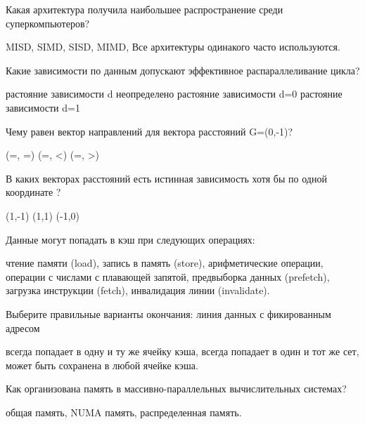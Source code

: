 \documentclass[a4paper, 12pt, addpoints]{exam}
\begin{document}
\begin{questions}
\question[1] Какая архитектура получила наибольшее распространение среди суперкомпьютеров?
\begin{choices}
    \choice MISD,
    \choice SIMD,
    \choice SISD,
    \correctchoice MIMD,
    \choice Все архитектуры одинакого часто используются.
\end{choices}

\question[1] Какие зависимости по данным допускают эффективное распараллеливание цикла?
\begin{choices}
    \choice растояние зависимости d неопределено
    \correctchoice растояние зависимости d=0
    \choice растояние зависимости d=1
\end{choices}

\question[1] Чему равен вектор направлений для вектора расстояний G=(0,-1)?
\begin{choices}
    \choice (=, =)
    \choice (=, <)
    \correctchoice (=, >)
\end{choices}

\question[1] В каких векторах расстояний есть истинная зависимость хотя бы по одной координате ?
\begin{choices}
    \correctchoice (1,-1)
    \correctchoice (1,1)
    \choice (-1,0)
\end{choices}

\question[1] Данные могут попадать в кэш при следующих операциях:
\begin{choices}
    \correctchoice чтение памяти (load),
    \correctchoice запись в память (store),
    \choice арифметические операции,
    \choice операции с числами с плавающей запятой,
    \correctchoice предвыборка данных (prefetch),
    \correctchoice загрузка инструкции (fetch),
    \choice инвалидация линии (invalidate).
\end{choices}

\question[1] Выберите правильные варианты окончания: линия данных с фикированным адресом
\begin{choices}
    \choice всегда попадает в одну и ту же ячейку кэша,
    \correctchoice всегда попадает в один и тот же сет,
    \choice может быть сохранена в любой ячейке кэша.
\end{choices}

\question[1] Как организована память в массивно-параллельных вычислительных системах?
\begin{choices}
    \choice общая память,
    \choice NUMA память,
    \correctchoice распределенная память.
\end{choices}


\end{questions}
\end{document}
